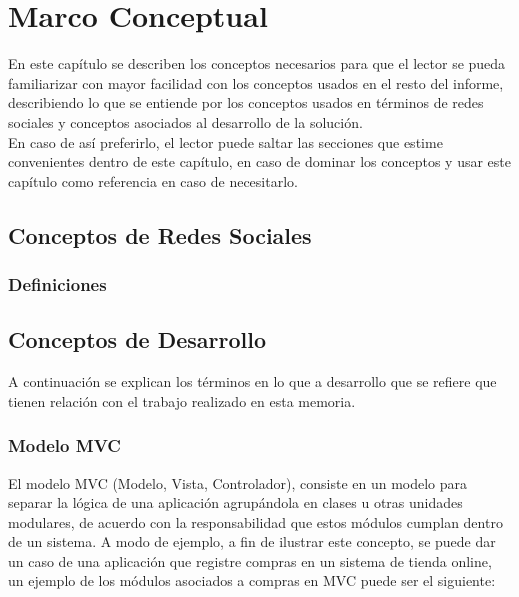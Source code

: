 \chapter{Marco Conceptual}

En este capítulo se describen los conceptos necesarios para que el lector se pueda familiarizar con mayor facilidad con los conceptos usados en el resto del informe, describiendo lo que se entiende por los conceptos usados en términos de redes sociales y conceptos asociados al desarrollo de la solución.\\

En caso de así preferirlo, el lector puede saltar las secciones que estime convenientes dentro de este capítulo, en caso de dominar los conceptos y usar este capítulo como referencia en caso de necesitarlo.

\section{Conceptos de Redes Sociales} %
\label{sec:conceptos_de_redes_sociales}

\subsection{Definiciones} %
\label{sub:definiciones}


\section{Conceptos de Desarrollo} %
\label{sec:conceptos_de_desarrollo}

A continuación se explican los términos en lo que a desarrollo que se refiere que tienen relación con el trabajo realizado en esta memoria.

\subsection{Modelo MVC} %
\label{sub:modelo_mvc}
El modelo MVC (Modelo, Vista, Controlador), consiste en un modelo para separar la lógica de una aplicación agrupándola en clases u otras unidades modulares, de acuerdo con la responsabilidad que estos módulos cumplan dentro de un sistema. A modo de ejemplo, a fin de ilustrar este concepto, se puede dar un caso de una aplicación que registre compras en un sistema de tienda online, un ejemplo de los módulos asociados a compras en MVC puede ser el siguiente:


